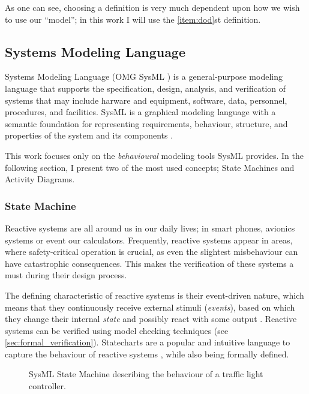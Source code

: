 As one can see, choosing a definition is very much dependent upon how we wish to use our \enquote{model}; in this work I will use the \ref{item:dod}st definition.

\subsection{Systems Modeling Language}\label{ssec:sysml}

Systems Modeling Language (OMG SysML \cite{omg_sysml}) is a general-purpose modeling language that supports the specification, design, analysis, and verification of systems that may include harware and equipment, software, data, personnel, procedures, and facilities. SysML is a graphical modeling language with a semantic foundation for representing requirements, behaviour, structure, and properties of the system and its components \cite{sysml_practical_guide}.

This work focuses only on the \emph{behavioural} modeling tools SysML provides. In the following section, I present two of the most used concepts; State Machines and Activity Diagrams.

\subsubsection*{State Machine}

Reactive systems are all around us in our daily lives; in smart phones, avionics systems or event our calculators. Frequently, reactive systems appear in areas, where safety-critical operation is crucial, as even the slightest
misbehaviour can have catastrophic consequences. This makes the verification of these systems a must during their design process.

The defining characteristic of reactive systems is their event-driven nature, which means that they continuously receive external stimuli (\emph{events}), based on which they change their internal \emph{state} and possibly react with some output \cite{10.1007/978-3-642-82453-1_17}. Reactive systems can be verified using model checking techniques (see \autoref{sec:formal_verification}). Statecharts \cite{HAREL1987231} are a popular and intuitive language to capture the behaviour of reactive systems \cite{10.1145/3417990.3421407, 10.1007/978-3-319-11653-2_10}, while also being formally defined.

\begin{figure}[!ht]
	\centering
	
	\caption{SysML State Machine describing the behaviour of a traffic light controller.}
	\label{fig:sysml_state_machine}
\end{figure}

